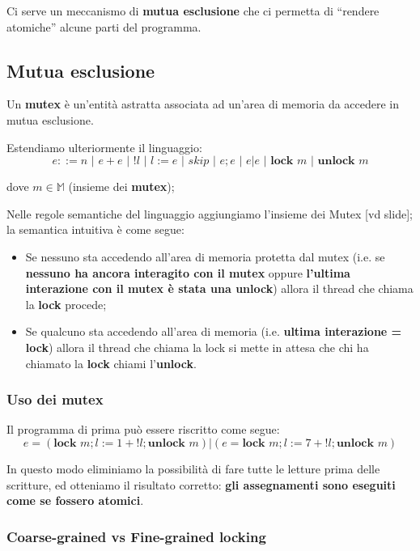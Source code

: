 \documentclass[a4paper,10pt]{article}
\begin{document}
Ci serve un meccanismo di \textbf{mutua esclusione} che ci permetta di ``rendere atomiche'' alcune parti del programma.

\subsection{Mutua esclusione}
Un \textbf{mutex} è un'entità astratta associata ad un'area di memoria da accedere in mutua esclusione.\smallskip

Estendiamo ulteriormente il linguaggio:
\[e ::= n \,\,|\,\, e+e \,\,|\,\, !l \,\,|\,\, l := e \,\,|\,\, skip \,\,|\,\, e;e \,\, | \,\,e| e \,\,|\,\, \textbf{lock }m\,\,|\,\, \textbf{unlock }m\]

dove $m \in \mathbb M$ (insieme dei \textbf{mutex}); \smallskip

Nelle regole semantiche del linguaggio aggiungiamo l'insieme dei Mutex [vd slide]; la semantica intuitiva è come segue:

\begin{itemize}
 \item Se nessuno sta accedendo all'area di memoria protetta dal mutex (i.e. se \textbf{nessuno ha ancora interagito con il mutex} oppure \textbf{l'ultima interazione con il mutex è stata una unlock}) allora il thread che chiama la \textbf{lock} procede; 
 \item Se qualcuno sta accedendo all'area di memoria (i.e. \textbf{ultima interazione = lock}) allora il thread che chiama la lock si mette in attesa che chi ha chiamato la \textbf{lock} chiami l'\textbf{unlock}.
\end{itemize}


\subsubsection{Uso dei mutex}
Il programma di prima può essere riscritto come segue:
\[ e = (\textbf{lock } m; l := 1+!l; \textbf{unlock }m) | (e = \textbf{lock } m; l := 7+!l; \textbf{unlock }m) \]

In questo modo eliminiamo la possibilità di fare tutte le letture prima delle scritture, ed otteniamo il risultato corretto: \textbf{gli assegnamenti sono eseguiti come se fossero atomici}.
\newpage
\subsubsection{Coarse-grained vs Fine-grained locking}
\end{document}
